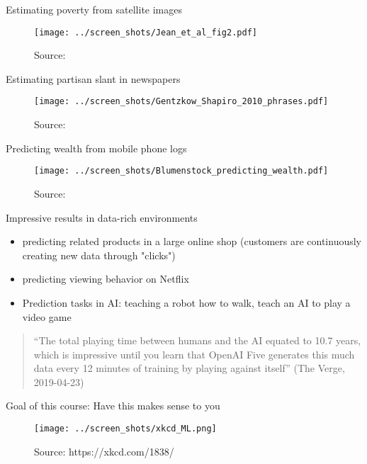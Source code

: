 \documentclass[xcolor=dvipsnames]{beamer}
\begin{document}
\begin{frame}{Estimating poverty from satellite images}
\begin{figure}
  \texttt{[image: ../screen\_shots/Jean\_et\_al\_fig2.pdf]}
   \caption{Source: \textcite{jean2016combining}}
\end{figure}
\end{frame}


\begin{frame}{Estimating partisan slant in newspapers}
\begin{figure}
  \texttt{[image: ../screen\_shots/Gentzkow\_Shapiro\_2010\_phrases.pdf]}
   \caption{Source: \textcite{gentzkow2010drives}}
\end{figure}
\end{frame}


\begin{frame}{Predicting wealth from mobile phone logs}
\begin{figure}
  \texttt{[image: ../screen\_shots/Blumenstock\_predicting\_wealth.pdf]}
   \caption{Source: \textcite{blumenstock2015predicting}}
\end{figure}
\end{frame}



\begin{frame}{Impressive results in data-rich environments}
\begin{itemize}
  \item 
  predicting related products in a large online shop (customers are continuously creating new data through "clicks")
  \item 
  predicting viewing behavior on Netflix
  \item 
  \pause
  Prediction tasks in AI: teaching a robot how to walk, teach an AI to play a video game 
\end{itemize}
\begin{quote}
``The total playing time between humans and the AI equated to 10.7 years, which is impressive until you learn that OpenAI Five generates this much data every 12 minutes of training by playing against itself'' (The Verge, 2019-04-23)
\end{quote}
\end{frame}


\begin{frame}{Goal of this course: Have this makes sense to you}
\begin{figure}
  \texttt{[image: ../screen\_shots/xkcd\_ML.png]}
   \caption{Source: https://xkcd.com/1838/}
\end{figure}
\end{frame}
\end{document}

